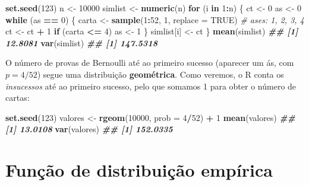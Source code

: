 \documentclass[
  portuguese,
  11pt,
  openany]{book}
\newenvironment{Shaded}{\begin{snugshade}}{\end{snugshade}}
\newcommand{\AttributeTok}[1]{\textcolor[rgb]{0.13,0.29,0.53}{#1}}
\newcommand{\CommentTok}[1]{\textcolor[rgb]{0.56,0.35,0.01}{\textit{#1}}}
\newcommand{\ConstantTok}[1]{\textcolor[rgb]{0.56,0.35,0.01}{#1}}
\newcommand{\ControlFlowTok}[1]{\textcolor[rgb]{0.13,0.29,0.53}{\textbf{#1}}}
\newcommand{\DecValTok}[1]{\textcolor[rgb]{0.00,0.00,0.81}{#1}}
\newcommand{\DocumentationTok}[1]{\textcolor[rgb]{0.56,0.35,0.01}{\textbf{\textit{#1}}}}
\newcommand{\FunctionTok}[1]{\textcolor[rgb]{0.13,0.29,0.53}{\textbf{#1}}}
\newcommand{\NormalTok}[1]{#1}
\newcommand{\OtherTok}[1]{\textcolor[rgb]{0.56,0.35,0.01}{#1}}
\newcommand{\SpecialCharTok}[1]{\textcolor[rgb]{0.81,0.36,0.00}{\textbf{#1}}}
\begin{document}
\begin{Shaded}
\begin{Highlighting}[]
\FunctionTok{set.seed}\NormalTok{(}\DecValTok{123}\NormalTok{)}
\NormalTok{n }\OtherTok{\textless{}{-}} \DecValTok{10000}
\NormalTok{simlist }\OtherTok{\textless{}{-}} \FunctionTok{numeric}\NormalTok{(n)}
\ControlFlowTok{for}\NormalTok{ (i }\ControlFlowTok{in} \DecValTok{1}\SpecialCharTok{:}\NormalTok{n) \{}
\NormalTok{  ct }\OtherTok{\textless{}{-}} \DecValTok{0}
\NormalTok{  as }\OtherTok{\textless{}{-}} \DecValTok{0}
  \ControlFlowTok{while}\NormalTok{ (as }\SpecialCharTok{==} \DecValTok{0}\NormalTok{) \{}
\NormalTok{    carta }\OtherTok{\textless{}{-}} \FunctionTok{sample}\NormalTok{(}\DecValTok{1}\SpecialCharTok{:}\DecValTok{52}\NormalTok{, }\DecValTok{1}\NormalTok{, }\AttributeTok{replace =} \ConstantTok{TRUE}\NormalTok{)   }\CommentTok{\# ases: 1, 2, 3, 4}
\NormalTok{    ct }\OtherTok{\textless{}{-}}\NormalTok{ ct }\SpecialCharTok{+} \DecValTok{1}
    \ControlFlowTok{if}\NormalTok{ (carta }\SpecialCharTok{\textless{}=} \DecValTok{4}\NormalTok{) as }\OtherTok{\textless{}{-}} \DecValTok{1}
\NormalTok{  \}}
\NormalTok{  simlist[i] }\OtherTok{\textless{}{-}}\NormalTok{ ct}
\NormalTok{\}}
\FunctionTok{mean}\NormalTok{(simlist)}
\DocumentationTok{\#\# [1] 12.8081}
\FunctionTok{var}\NormalTok{(simlist)}
\DocumentationTok{\#\# [1] 147.5318}
\end{Highlighting}
\end{Shaded}

O número de provas de Bernoulli até ao primeiro sucesso (aparecer um ás, com
\(p = 4/52\)) segue uma distribuição \textbf{geométrica}. Como veremos, o R conta os
\emph{insucessos} até ao primeiro sucesso, pelo que somamos 1 para obter o número de cartas:

\begin{Shaded}
\begin{Highlighting}[]
\FunctionTok{set.seed}\NormalTok{(}\DecValTok{123}\NormalTok{)}
\NormalTok{valores }\OtherTok{\textless{}{-}} \FunctionTok{rgeom}\NormalTok{(}\DecValTok{10000}\NormalTok{, }\AttributeTok{prob =} \DecValTok{4}\SpecialCharTok{/}\DecValTok{52}\NormalTok{) }\SpecialCharTok{+} \DecValTok{1}
\FunctionTok{mean}\NormalTok{(valores)}
\DocumentationTok{\#\# [1] 13.0108}
\FunctionTok{var}\NormalTok{(valores)}
\DocumentationTok{\#\# [1] 152.0335}
\end{Highlighting}
\end{Shaded}

\section{Função de distribuição empírica}\label{funuxe7uxe3o-de-distribuiuxe7uxe3o-empuxedrica}
\end{document}
